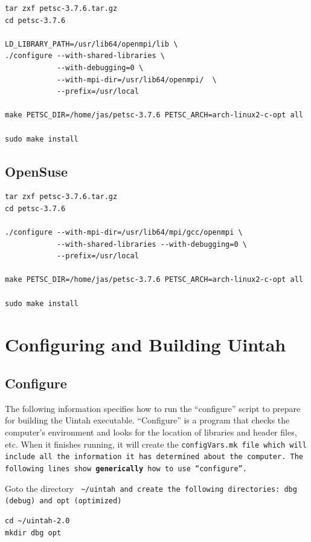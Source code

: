 \documentclass[12pt]{article}
\newcommand{\TT}[1]{\tt{#1} \normalfont}
\begin{document}
\begin{verbatim}
tar zxf petsc-3.7.6.tar.gz
cd petsc-3.7.6

LD_LIBRARY_PATH=/usr/lib64/openmpi/lib \
./configure --with-shared-libraries \
            --with-debugging=0 \
            --with-mpi-dir=/usr/lib64/openmpi/  \
            --prefix=/usr/local

make PETSC_DIR=/home/jas/petsc-3.7.6 PETSC_ARCH=arch-linux2-c-opt all

sudo make install 
\end{verbatim}

\subsection{OpenSuse}
\label{petsc-opensuse}
\begin{verbatim}
tar zxf petsc-3.7.6.tar.gz
cd petsc-3.7.6

./configure --with-mpi-dir=/usr/lib64/mpi/gcc/openmpi \
            --with-shared-libraries --with-debugging=0 \
            --prefix=/usr/local

make PETSC_DIR=/home/jas/petsc-3.7.6 PETSC_ARCH=arch-linux2-c-opt all

sudo make install

\end{verbatim}


\section{Configuring and Building Uintah}

\subsection{Configure}

The following information specifies how to run the ``configure''
script to prepare for building the Uintah executable.  ``Configure''
is a program that checks the computer's environment and looks for the
location of libraries and header files, etc.  When it finishes
running, it will create the \TT{configVars.mk} file which will include
all the information it has determined about the computer.  The
following lines show \textbf{generically} how to use ``configure''.

Goto the directory \TT{ \textasciitilde/uintah} and create the
following directories: \TT{dbg} (debug) and \TT{opt} (optimized)

\begin{verbatim}
cd ~/uintah-2.0
mkdir dbg opt
\end{verbatim}
\end{document}
